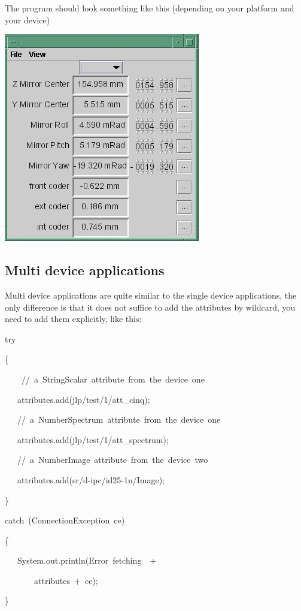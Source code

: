 The program should look something like this (depending on your platform
and your device)

\begin{center}
\includegraphics[scale=0.75]{atk/img/prog_guide_exple1}
\par\end{center}

\subsection{Multi device applications}

Multi device applications are quite similar to the single device applications,
the only difference is that it does not suffice to add the attributes
by wildcard, you need to add them explicitly, like this: \\


\begin{lyxcode}
try

\{~

~~~~//~a~StringScalar~attribute~from~the~device~one

~~~attributes.add(\textquotedbl{}jlp/test/1/att\_cinq\textquotedbl{});

~~~//~a~NumberSpectrum~attribute~from~the~device~one

~~~attributes.add(\textquotedbl{}jlp/test/1/att\_spectrum\textquotedbl{});

~~~//~a~NumberImage~attribute~from~the~device~two

~~~attributes.add(\textquotedbl{}sr/d-ipc/id25-1n/Image\textquotedbl{});

\}

catch~(ConnectionException~ce)

\{

~~~System.out.println(\textquotedbl{}Error~fetching~\textquotedbl{}~+~

~~~~~~~\textquotedbl{}attributes\textquotedbl{}~+~ce);

\}

\end{lyxcode}


